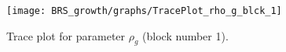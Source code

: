 \begin{figure}[H]
\centering
  \texttt{[image: BRS\_growth/graphs/TracePlot\_rho\_g\_blck\_1]}\\
    \caption{Trace plot for parameter ${\rho_g}$ (block number 1).}
\end{figure}
